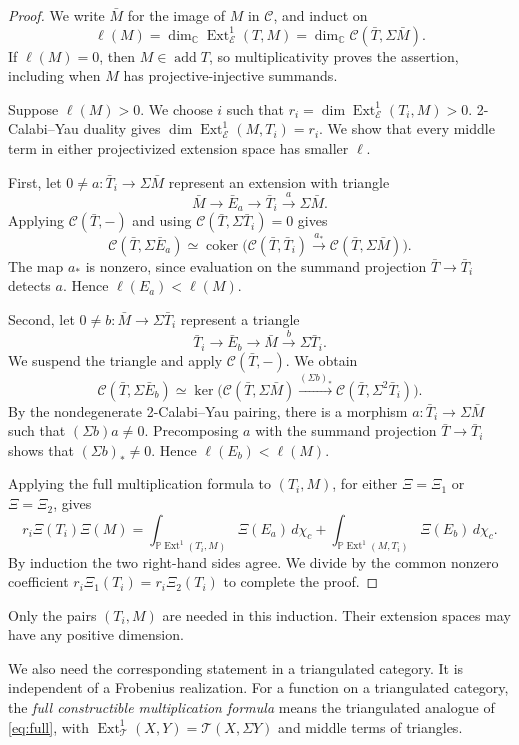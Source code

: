 \documentclass[11pt]{amsart}
\numberwithin{equation}{section}
\theoremstyle{definition}
\theoremstyle{remark}
\newcommand{\op}[1]{\operatorname{#1}}
\newcommand{\E}{\mathcal E}
\newcommand{\C}{\mathcal C}
\newcommand{\kk}{\mathbb C}
\newcommand{\PP}{\mathbb P}
\newcommand{\add}{\op{add}}
\newcommand{\Ext}{\op{Ext}}
\newcommand{\coker}{\op{coker}}
\begin{document}
\begin{proof}
We write $\bar M$ for the image of $M$ in $\C$, and induct on
\[ \ell(M)=\dim_\kk\Ext^1_\E(T,M) =\dim_\kk\C(\bar T,\Sigma\bar M). \]
If $\ell(M)=0$, then $M\in\add T$, so multiplicativity proves the
assertion, including when $M$ has projective-injective summands.

Suppose $\ell(M)>0$. We choose $i$ such that
$r_i=\dim\Ext^1_\E(T_i,M)>0$.
2-Calabi--Yau duality gives
$\dim\Ext^1_\E(M,T_i)=r_i$. We show that every middle term in either
projectivized extension space has smaller $\ell$.

First, let $0\ne a:\bar T_i\to\Sigma\bar M$ represent an extension
with triangle
\[ \bar M\longrightarrow\bar E_a\longrightarrow\bar T_i \xrightarrow{a}\Sigma\bar M. \]
Applying $\C(\bar T,-)$ and using
$\C(\bar T,\Sigma\bar T_i)=0$ gives
\[ \C(\bar T,\Sigma\bar E_a) \simeq\coker\bigl(\C(\bar T,\bar T_i) \xrightarrow{a_*}\C(\bar T,\Sigma\bar M)\bigr). \]
The map $a_*$ is nonzero, since evaluation on the summand projection
$\bar T\to\bar T_i$ detects $a$. Hence $\ell(E_a)<\ell(M)$.

Second, let $0\ne b:\bar M\to\Sigma\bar T_i$ represent a triangle
\[ \bar T_i\longrightarrow\bar E_b\longrightarrow\bar M \xrightarrow{b}\Sigma\bar T_i. \]
We suspend the triangle and apply $\C(\bar T,-)$. We obtain
\[ \C(\bar T,\Sigma\bar E_b) \simeq\ker\bigl(\C(\bar T,\Sigma\bar M) \xrightarrow{(\Sigma b)_*}\C(\bar T,\Sigma^2\bar T_i)\bigr). \]
By the nondegenerate 2-Calabi--Yau pairing, there is a morphism
$a:\bar T_i\to\Sigma\bar M$ such that $(\Sigma b)a\ne0$.
Precomposing $a$ with the summand projection $\bar T\to\bar T_i$
shows that $(\Sigma b)_*\ne0$. Hence $\ell(E_b)<\ell(M)$.

Applying the full multiplication formula to $(T_i,M)$, for either
$\Xi=\Xi_1$ or $\Xi=\Xi_2$, gives
\[ r_i \Xi(T_i)\Xi(M) =\int_{\PP\Ext^1(T_i,M)}\Xi(E_a)\,d\chi_c +\int_{\PP\Ext^1(M,T_i)}\Xi(E_b)\,d\chi_c. \]
By induction the two right-hand sides agree. We divide by the common
nonzero coefficient $r_i \Xi_1(T_i)=r_i \Xi_2(T_i)$ to complete the proof.
\end{proof}

Only the pairs $(T_i,M)$ are needed in this induction. Their extension
spaces may have any positive dimension.

We also need the corresponding statement in a triangulated category.
It is independent of a Frobenius realization. For a function on a
triangulated category, the \emph{full constructible multiplication formula}
means the triangulated analogue of \eqref{eq:full}, with
$\Ext^1_{\mathcal T}(X,Y)=\mathcal T(X,\Sigma Y)$ and middle terms of
triangles.
\end{document}
